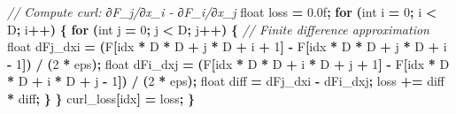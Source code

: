 \documentclass[
  11pt,
  a4paper,
]{article}
\newenvironment{Shaded}{\begin{snugshade}}{\end{snugshade}}
\newcommand{\BuiltInTok}[1]{#1}
\newcommand{\CommentTok}[1]{\textcolor[rgb]{0.56,0.35,0.01}{\textit{#1}}}
\newcommand{\ControlFlowTok}[1]{\textcolor[rgb]{0.13,0.29,0.53}{\textbf{#1}}}
\newcommand{\DataTypeTok}[1]{\textcolor[rgb]{0.13,0.29,0.53}{#1}}
\newcommand{\DecValTok}[1]{\textcolor[rgb]{0.00,0.00,0.81}{#1}}
\newcommand{\FloatTok}[1]{\textcolor[rgb]{0.00,0.00,0.81}{#1}}
\newcommand{\NormalTok}[1]{#1}
\newcommand{\OperatorTok}[1]{\textcolor[rgb]{0.81,0.36,0.00}{\textbf{#1}}}
\begin{document}
\begin{Shaded}
\begin{Highlighting}[]
    \CommentTok{// Compute curl: ∂F\_j/∂x\_i {-} ∂F\_i/∂x\_j}
    \DataTypeTok{float}\NormalTok{ loss }\OperatorTok{=} \FloatTok{0.0}\BuiltInTok{f}\OperatorTok{;}
    \ControlFlowTok{for} \OperatorTok{(}\DataTypeTok{int}\NormalTok{ i }\OperatorTok{=} \DecValTok{0}\OperatorTok{;}\NormalTok{ i }\OperatorTok{\textless{}}\NormalTok{ D}\OperatorTok{;}\NormalTok{ i}\OperatorTok{++)} \OperatorTok{\{}
        \ControlFlowTok{for} \OperatorTok{(}\DataTypeTok{int}\NormalTok{ j }\OperatorTok{=} \DecValTok{0}\OperatorTok{;}\NormalTok{ j }\OperatorTok{\textless{}}\NormalTok{ D}\OperatorTok{;}\NormalTok{ j}\OperatorTok{++)} \OperatorTok{\{}
            \CommentTok{// Finite difference approximation}
            \DataTypeTok{float}\NormalTok{ dFj\_dxi }\OperatorTok{=} \OperatorTok{(}\NormalTok{F}\OperatorTok{[}\NormalTok{idx }\OperatorTok{*}\NormalTok{ D }\OperatorTok{*}\NormalTok{ D }\OperatorTok{+}\NormalTok{ j }\OperatorTok{*}\NormalTok{ D }\OperatorTok{+}\NormalTok{ i }\OperatorTok{+} \DecValTok{1}\OperatorTok{]} \OperatorTok{{-}} 
\NormalTok{                             F}\OperatorTok{[}\NormalTok{idx }\OperatorTok{*}\NormalTok{ D }\OperatorTok{*}\NormalTok{ D }\OperatorTok{+}\NormalTok{ j }\OperatorTok{*}\NormalTok{ D }\OperatorTok{+}\NormalTok{ i }\OperatorTok{{-}} \DecValTok{1}\OperatorTok{])} \OperatorTok{/} \OperatorTok{(}\DecValTok{2} \OperatorTok{*}\NormalTok{ eps}\OperatorTok{);}
            \DataTypeTok{float}\NormalTok{ dFi\_dxj }\OperatorTok{=} \OperatorTok{(}\NormalTok{F}\OperatorTok{[}\NormalTok{idx }\OperatorTok{*}\NormalTok{ D }\OperatorTok{*}\NormalTok{ D }\OperatorTok{+}\NormalTok{ i }\OperatorTok{*}\NormalTok{ D }\OperatorTok{+}\NormalTok{ j }\OperatorTok{+} \DecValTok{1}\OperatorTok{]} \OperatorTok{{-}} 
\NormalTok{                             F}\OperatorTok{[}\NormalTok{idx }\OperatorTok{*}\NormalTok{ D }\OperatorTok{*}\NormalTok{ D }\OperatorTok{+}\NormalTok{ i }\OperatorTok{*}\NormalTok{ D }\OperatorTok{+}\NormalTok{ j }\OperatorTok{{-}} \DecValTok{1}\OperatorTok{])} \OperatorTok{/} \OperatorTok{(}\DecValTok{2} \OperatorTok{*}\NormalTok{ eps}\OperatorTok{);}
            \DataTypeTok{float}\NormalTok{ diff }\OperatorTok{=}\NormalTok{ dFj\_dxi }\OperatorTok{{-}}\NormalTok{ dFi\_dxj}\OperatorTok{;}
\NormalTok{            loss }\OperatorTok{+=}\NormalTok{ diff }\OperatorTok{*}\NormalTok{ diff}\OperatorTok{;}
        \OperatorTok{\}}
    \OperatorTok{\}}
\NormalTok{    curl\_loss}\OperatorTok{[}\NormalTok{idx}\OperatorTok{]} \OperatorTok{=}\NormalTok{ loss}\OperatorTok{;}
\OperatorTok{\}}
\end{Highlighting}
\end{Shaded}
\end{document}
